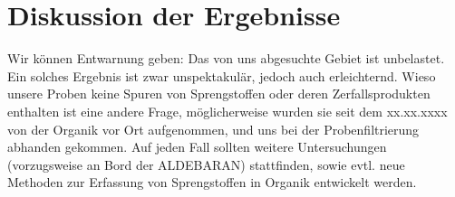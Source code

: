 \section[Diskussion der Ergebnisse]{Diskussion der Ergebnisse}
Wir können Entwarnung geben: Das von uns abgesuchte Gebiet ist unbelastet. Ein
solches Ergebnis ist zwar unspektakulär, jedoch auch erleichternd. Wieso 
unsere Proben keine Spuren von Sprengstoffen oder deren Zerfallsprodukten 
enthalten ist eine andere Frage, möglicherweise wurden sie seit dem xx.xx.xxxx%
von der Organik vor Ort aufgenommen, und uns bei der Probenfiltrierung
abhanden gekommen. Auf jeden Fall sollten weitere Untersuchungen (vorzugsweise
an Bord der ALDEBARAN) stattfinden, sowie evtl. neue Methoden zur Erfassung
von Sprengstoffen in Organik entwickelt werden.
